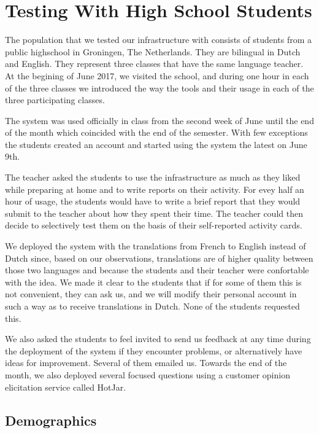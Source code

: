
\newpage
\section{Testing With High School Students}
\label{sec:demographics}

The population that we tested our infrastructure with consists of \stcnt  students from a public highschool in Groningen, The Netherlands. They are bilingual in Dutch and English. They represent three classes that have the same language teacher. At the begining of June 2017, we visited the school, and during one hour in each of the three classes we introduced the way the tools and their usage in each of the three participating classes.

The system was used officially in class from the second week of June until the end of the month which coincided with the end of the semester. With few exceptions the students created an account and started using the system the latest on June 9th. 

The teacher asked the students to use the infrastructure as much as they liked while preparing at home and to write reports on their activity. For evey half an hour of usage, the students would have to write a brief report that they would submit to the teacher about how they spent their time. The teacher could then decide to selectively test them on the basis of their self-reported activity cards.

We deployed the system with the translations from French to English instead of Dutch since, based on our observations, translations are of higher quality between those two languages and because the students and their teacher were confortable with the idea. We made it clear to the students that if for some of them this is not convenient, they can ask us, and we will modify their personal account in such a way as to receive translations in Dutch. None of the students requested this.

We also asked the students to feel invited to send us feedback at any time during the deployment of the system if they encounter problems, or alternatively have ideas for improvement. Several of them emailed us. Towards the end of the month, we also deployed several focused questions using a customer opinion elicitation service called HotJar. 

\subsection{Demographics}

